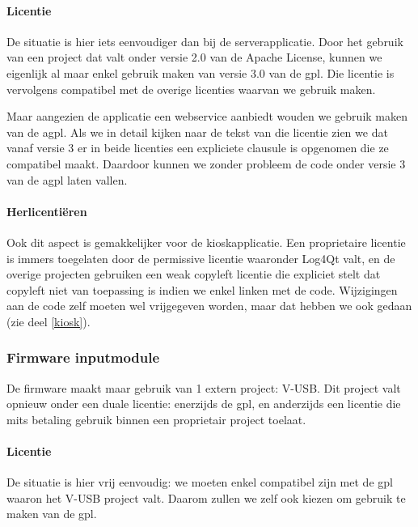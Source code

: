 \paragraph{Licentie} De situatie is hier iets eenvoudiger dan bij de serverapplicatie. Door het gebruik van een project dat valt onder versie 2.0 van de Apache License, kunnen we eigenlijk al maar enkel gebruik maken van versie 3.0 van de \ac{gpl}. Die licentie is vervolgens compatibel met de overige licenties waarvan we gebruik maken.

Maar aangezien de applicatie een webservice aanbiedt wouden we gebruik maken van de \ac{agpl}. Als we in detail kijken naar de tekst van die licentie zien we dat vanaf versie 3 er in beide licenties een expliciete clausule \citetext{\citealp[sectie 13]{fsf:gpl}; \citealp[sectie 13]{fsf:agpl}} is opgenomen die ze compatibel maakt. Daardoor kunnen we zonder probleem de code onder versie 3 van de \ac{agpl} laten vallen.

\paragraph{Herlicentiëren} Ook dit aspect is gemakkelijker voor de kioskapplicatie. Een proprietaire licentie is immers toegelaten door de permissive licentie waaronder Log4Qt valt, en de overige projecten gebruiken een weak copyleft licentie die expliciet stelt dat copyleft niet van toepassing is indien we enkel linken met de code. Wijzigingen aan de code zelf moeten wel vrijgegeven worden, maar dat hebben we ook gedaan (zie deel \ref{kiosk}).

\subsubsection{Firmware inputmodule}
\label{ontwerp:licenties:keuze:software:inputmodule}

De firmware maakt maar gebruik van 1 extern project: V-USB. Dit project valt opnieuw onder een duale licentie: enerzijds de \ac{gpl}, en anderzijds een licentie die mits betaling gebruik binnen een proprietair project toelaat.

\paragraph{Licentie} De situatie is hier vrij eenvoudig: we moeten enkel compatibel zijn met de \ac{gpl} waaron het V-USB project valt. Daarom zullen we zelf ook kiezen om gebruik te maken van de \ac{gpl}.

